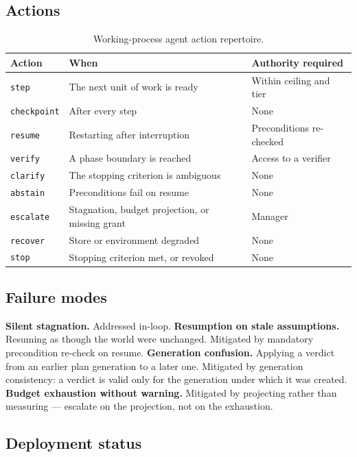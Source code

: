 \documentclass[11pt]{article}
\newcommand{\code}[1]{\texttt{\small #1}}
\begin{document}
\subsection{Actions}

\begin{table}[h]
\centering\small
\caption{Working-process agent action repertoire.}
\label{tab:prc-actions}
\begin{tabular}{@{}L{2.1cm}L{5.7cm}L{5.4cm}@{}}
\toprule
\textbf{Action} & \textbf{When} & \textbf{Authority required} \\
\midrule
\code{step} & The next unit of work is ready & Within ceiling and tier \\
\code{checkpoint} & After every step & None \\
\code{resume} & Restarting after interruption & Preconditions re-checked \\
\code{verify} & A phase boundary is reached & Access to a verifier \\
\code{clarify} & The stopping criterion is ambiguous & None \\
\code{abstain} & Preconditions fail on resume & None \\
\code{escalate} & Stagnation, budget projection, or missing grant & Manager \\
\code{recover} & Store or environment degraded & None \\
\code{stop} & Stopping criterion met, or revoked & None \\
\bottomrule
\end{tabular}
\end{table}

\subsection{Failure modes}

\textbf{Silent stagnation.} Addressed in-loop.
\textbf{Resumption on stale assumptions.} Resuming as though the world were unchanged. Mitigated by mandatory precondition re-check on resume.
\textbf{Generation confusion.} Applying a verdict from an earlier plan generation to a later one. Mitigated by generation consistency: a verdict is valid only for the generation under which it was created.
\textbf{Budget exhaustion without warning.} Mitigated by projecting rather than measuring --- escalate on the projection, not on the exhaustion.

\subsection{Deployment status}
\end{document}
